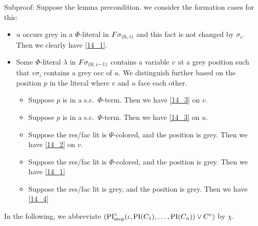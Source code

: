 \documentclass[,%
	draft=false,%
	numbers=noendperiod
	12pt,
	a4paper,
	oneside,%
	openany,
]{memoir}
\begin{document}
{\begin{enumerate}
\end{enumerate}
\noindent
Subproof:
Suppose the lemma precondition. we consider the formation cases for this:
\begin{itemize}
	\item $u$ occurs grey in a $\Phi$-literal in $F\sigma_{(0,\,i)}$ and this fact is not changed by $\sigma_i$.
		Then we clearly have \ref{14_1}.

	\item Some $\Phi$-literal $\lambda$ in $F\sigma_{(0,\,i-1)}$ contains a variable $v$ at a grey position such that $v\sigma_i$ contains a grey occ of $u$. 
		We distinguish further based on the position $p$ in the literal where $v$ and $u$ face each other.

		\begin{itemize}
			\item Suppose $p$ is in a s.c.\ $\Phi$-term. Then we have \ref{14_3} on $v$.
			\item Suppose $p$ is in a s.c.\ $\Psi$-term. Then we have \ref{14_3} on $u$.
			\item Suppose the res/fac lit is $\Psi$-colored, and the position is grey. Then we have \ref{14_2} on $v$.
			\item Suppose the res/fac lit is $\Phi$-colored, and the position is grey. Then we have \ref{14_1}
			\item Suppose the res/fac lit is grey, and the position is grey. Then we have \ref{14_4}

		\end{itemize}


\end{itemize}
}


\clearpage
\newcommand{\inv}{\ensuremath{\chi}}

In the following, we abbreviate $(\operatorname{PI}^\circ_{\mathrm{step}}(\iota, \operatorname{PI}(C_1), \dots, \operatorname{PI}(C_n)) \lor C^\circ)$ by $\inv$.
\end{document}
